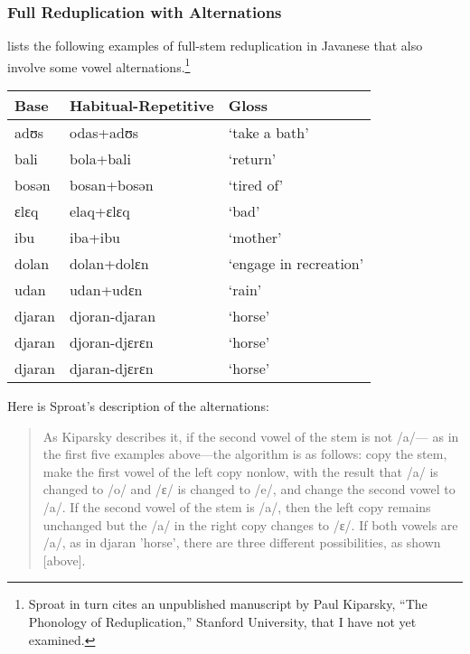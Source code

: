 \subsubsection{Full Reduplication with Alternations}

\citet[p. 57]{sproat:1992} lists the following examples of full-stem
reduplication in Javanese that also involve some vowel
alternations.\footnote{Sproat in turn
cites an unpublished manuscript by Paul
Kiparsky, ``The Phonology of Reduplication,'' Stanford University, that
I have not yet examined.}

\vspace{0.5cm}

\begin{tabular}{|l|l|l|}
\hline
     \textbf{Base}   & \textbf{Habitual-Repetitive} & \textbf{Gloss}\\
\hline
     adʊs   & odas+adʊs         &  `take a bath'\\
     bali   &bola+bali          & `return'\\
     bosən  &bosan+bosən        & `tired of'\\
     ɛlɛq   &elaq+ɛlɛq          & `bad'\\
     ibu    &iba+ibu            & `mother'\\
\hline
     dolan  &dolan+dolɛn       &  `engage in recreation'\\
     udan   &udan+udɛn         &  `rain'\\
\hline
     djaran &djoran-djaran     &  `horse'\\
     djaran &djoran-djɛrɛn     & `horse'\\
     djaran &djaran-djɛrɛn     &  `horse'\\
\hline
\end{tabular}

\vspace{0.5cm}

\noindent
Here is Sproat's description of the alternations:

\begin{quote}
As Kiparsky describes it, if the second vowel of the stem is not /a/---
 as in the first five examples above---the algorithm is as follows: 
 copy the stem, make the first vowel of the left copy nonlow, with the 
 result that /a/ is changed to /o/ and /ɛ/ is changed to /e/, and change 
 the second vowel to /a/. If the second vowel of the stem is /a/, then the 
 left copy remains unchanged but the /a/ in the right copy changes to /ɛ/. 
 If both vowels are /a/, as in djaran 'horse', there are three different 
 possibilities, as shown [above].
\end{quote}


